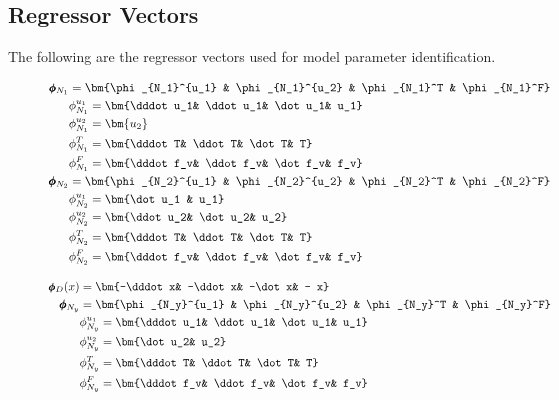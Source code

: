 \subsection*{Regressor Vectors}
The following are the regressor vectors used for model parameter identification.
\begin{figure}[H]
\begin{minipage}{0.45\columnwidth}
    \begin{align*}
        \small
        \pmb \phi_{N_1} &= \bm{\phi_{N_1}^{u_1} & \phi_{N_1}^{u_2} & \phi_{N_1}^T & \phi_{N_1}^F}\\
       & \phi_{N_1}^{u_1} = \bm{\dddot u_1& \ddot u_1& \dot u_1&  u_1}\\
       & \phi_{N_1}^{u_2} = \bm{u_2}\\
       & \phi_{N_1}^T = \bm{\dddot T& \ddot T& \dot T&  T}\\
       & \phi_{N_1}^F = \bm{\dddot f_v& \ddot f_v& \dot f_v&  f_v}\\
        \pmb \phi_{N_2} &= \bm{\phi_{N_2}^{u_1} & \phi_{N_2}^{u_2} & \phi_{N_2}^T & \phi_{N_2}^F}\\
       & \phi_{N_2}^{u_1} = \bm{\dot u_1 & u_1}\\
       & \phi_{N_2}^{u_2} = \bm{\ddot u_2& \dot u_2&  u_2}\\
       & \phi_{N_2}^T = \bm{\dddot T& \ddot T& \dot T&  T}\\
       & \phi_{N_2}^F = \bm{\dddot f_v& \ddot f_v& \dot f_v&  f_v}
    \end{align*}
\end{minipage}
\begin{minipage}{0.45\columnwidth}
    \begin{align*}
        \small
        \pmb \phi_D(x) &= \bm{-\dddot x& -\ddot x& -\dot x& - x}\\
         \pmb \phi_{N_y} &= \bm{\phi_{N_y}^{u_1} & \phi_{N_y}^{u_2} & \phi_{N_y}^T & \phi_{N_y}^F}\\
       & \phi_{N_y}^{u_1} = \bm{\dddot u_1& \ddot u_1& \dot u_1&  u_1}\\
       & \phi_{N_y}^{u_2} = \bm{\dot u_2&  u_2}\\
       & \phi_{N_y}^T = \bm{\dddot T& \ddot T& \dot T&  T}\\
       & \phi_{N_y}^F = \bm{\dddot f_v& \ddot f_v& \dot f_v&  f_v}
    \end{align*}
\end{minipage}
\end{figure}
